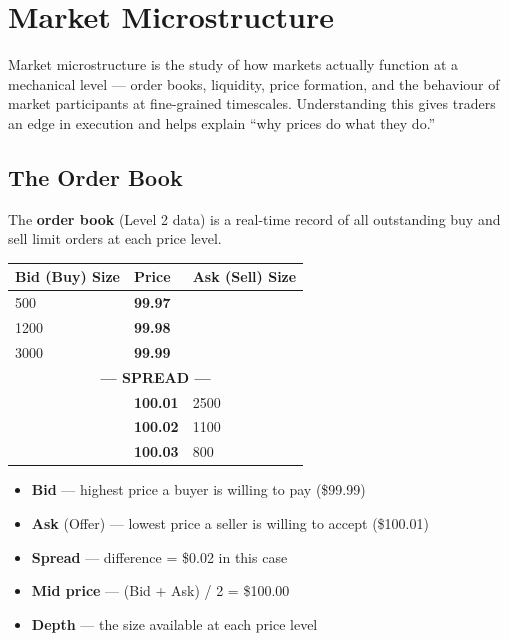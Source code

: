 
\chapter{Market Microstructure}

\begin{notebox}
Market microstructure is the study of how markets actually function at a mechanical level —
order books, liquidity, price formation, and the behaviour of market participants at
fine-grained timescales. Understanding this gives traders an edge in execution and
helps explain ``why prices do what they do.''
\end{notebox}

\section{The Order Book}

The \textbf{order book} (Level 2 data) is a real-time record of all outstanding buy
and sell limit orders at each price level.

\begin{center}
\begin{tabular}{p{3.5cm} >{\bfseries}p{3cm} p{3.5cm}}
\toprule
Bid (Buy) Size & Price & Ask (Sell) Size \\
\midrule
500 & 99.97 & \\
1200 & 99.98 & \\
3000 & 99.99 & \\
\multicolumn{3}{c}{\textbf{--- SPREAD ---}} \\
& 100.01 & 2500 \\
& 100.02 & 1100 \\
& 100.03 & 800 \\
\bottomrule
\end{tabular}
\end{center}

\begin{itemize}
  \item \textbf{Bid} — highest price a buyer is willing to pay (\$99.99)
  \item \textbf{Ask} (Offer) — lowest price a seller is willing to accept (\$100.01)
  \item \textbf{Spread} — difference = \$0.02 in this case
  \item \textbf{Mid price} — (Bid + Ask) / 2 = \$100.00
  \item \textbf{Depth} — the size available at each price level
\end{itemize}

